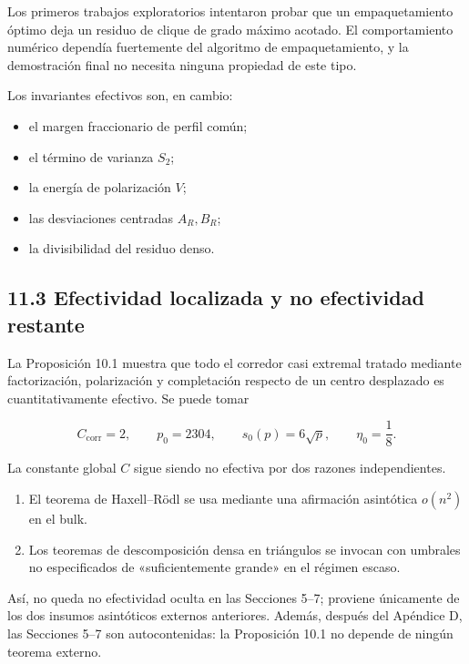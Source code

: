 \documentclass[
  11pt,
]{article}
\providecommand{\tightlist}{%
  \setlength{\itemsep}{0pt}\setlength{\parskip}{0pt}}
\begin{document}
Los primeros trabajos exploratorios intentaron probar que un
empaquetamiento óptimo deja un residuo de clique de grado máximo
acotado. El comportamiento numérico dependía fuertemente del algoritmo
de empaquetamiento, y la demostración final no necesita ninguna
propiedad de este tipo.

Los invariantes efectivos son, en cambio:

\begin{itemize}
\tightlist
\item
  el margen fraccionario de perfil común;
\item
  el término de varianza \(S_2\);
\item
  la energía de polarización \(V\);
\item
  las desviaciones centradas \(A_R,B_R\);
\item
  la divisibilidad del residuo denso.
\end{itemize}

\subsection{11.3 Efectividad localizada y no efectividad
restante}\label{efectividad-localizada-y-no-efectividad-restante}

La Proposición 10.1 muestra que todo el corredor casi extremal tratado
mediante factorización, polarización y completación respecto de un
centro desplazado es cuantitativamente efectivo. Se puede tomar

\[
C_{\mathrm{corr}}=2,
\qquad
p_0=2304,
\qquad
s_0(p)=6\sqrt p,
\qquad
\eta_0=\frac18.
\]

La constante global \(C\) sigue siendo no efectiva por dos razones
independientes.

\begin{enumerate}
\def\labelenumi{\arabic{enumi}.}
\tightlist
\item
  El teorema de Haxell--Rödl se usa mediante una afirmación asintótica
  \(o(n^2)\) en el bulk.
\item
  Los teoremas de descomposición densa en triángulos se invocan con
  umbrales no especificados de «suficientemente grande» en el régimen
  escaso.
\end{enumerate}

Así, no queda no efectividad oculta en las Secciones 5--7; proviene
únicamente de los dos insumos asintóticos externos anteriores. Además,
después del Apéndice D, las Secciones 5--7 son autocontenidas: la
Proposición 10.1 no depende de ningún teorema externo.
\end{document}
